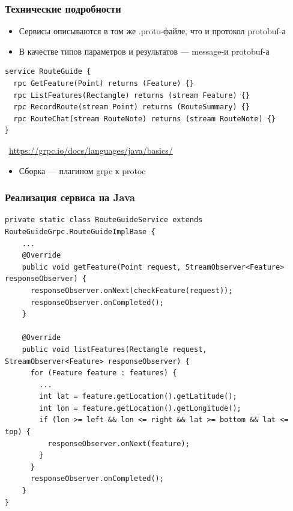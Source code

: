 \documentclass[xetex,mathserif,serif]{beamer}
\newcommand{\attribution}[1] {
    \vspace{-5mm}\begin{flushright}\begin{scriptsize}\textcolor{gray}{\textcopyright\, #1}\end{scriptsize}\end{flushright}
}
\begin{document}
    \begin{frame}[fragile]
        \frametitle{Технические подробности}
        \begin{itemize}
            \item Сервисы описываются в том же .proto-файле, что и протокол protobuf-а
            \item В качестве типов параметров и результатов --- message-и protobuf-а
        \end{itemize}
        \begin{verbatim}
service RouteGuide {
  rpc GetFeature(Point) returns (Feature) {}
  rpc ListFeatures(Rectangle) returns (stream Feature) {}
  rpc RecordRoute(stream Point) returns (RouteSummary) {}
  rpc RouteChat(stream RouteNote) returns (stream RouteNote) {}
}
        \end{verbatim}
        \attribution{\url{https://grpc.io/docs/languages/java/basics/}}
        \begin{itemize}
            \item Сборка --- плагином grpc к protoc
        \end{itemize}
\end{frame}

    \begin{frame}[fragile]
        \frametitle{Реализация сервиса на Java}
        \begin{scriptsize}
            \begin{verbatim}
private static class RouteGuideService extends RouteGuideGrpc.RouteGuideImplBase {
    ...
    @Override
    public void getFeature(Point request, StreamObserver<Feature> responseObserver) {
      responseObserver.onNext(checkFeature(request));
      responseObserver.onCompleted();
    }

    @Override
    public void listFeatures(Rectangle request, StreamObserver<Feature> responseObserver) {
      for (Feature feature : features) {
        ...
        int lat = feature.getLocation().getLatitude();
        int lon = feature.getLocation().getLongitude();
        if (lon >= left && lon <= right && lat >= bottom && lat <= top) {
          responseObserver.onNext(feature);
        }
      }
      responseObserver.onCompleted();
    }
}
            \end{verbatim}
        \end{scriptsize}
    \end{frame}
\end{document}
